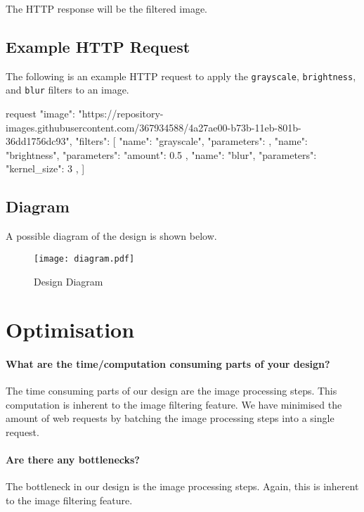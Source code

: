 \documentclass{csse4400}
\begin{document}
The HTTP response will be the filtered image.

\subsection{Example HTTP Request}

The following is an example HTTP request to apply the \texttt{grayscale}, \texttt{brightness}, and \texttt{blur} filters to an image.

\begin{code}[language=json]{request}
{
  "image": "https://repository-images.githubusercontent.com/367934588/4a27ae00-b73b-11eb-801b-36dd1756dc93",
  "filters": [
    {
      "name": "grayscale",
      "parameters": {}
    },
    {
      "name": "brightness",
      "parameters": {
        "amount": 0.5
      }
    },
    {
      "name": "blur",
      "parameters": {
        "kernel_size": 3
      }
    },
  ]
}
\end{code}

\clearpage

\subsection{Diagram}

A possible diagram of the design is shown below.

\begin{figure}[h]
    \centering
    \texttt{[image: diagram.pdf]}
    \caption{Design Diagram}
    \label{fig:diagram}
\end{figure}


\section{Optimisation}

\paragraph{What are the time/computation consuming parts of your design?}
The time consuming parts of our design are the image processing steps.
This computation is inherent to the image filtering feature.
We have minimised the amount of web requests by batching the image processing steps into a single request.

\paragraph{Are there any bottlenecks?}
The bottleneck in our design is the image processing steps.
Again, this is inherent to the image filtering feature.
\end{document}
